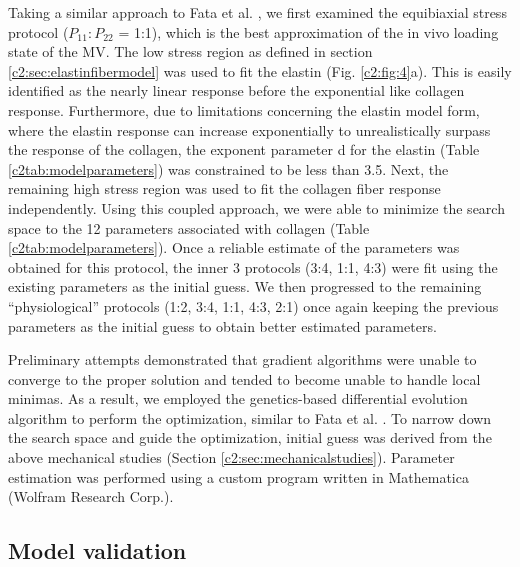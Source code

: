     Taking a similar approach to Fata et al. \cite{fata_insights_2014}, we first examined the equibiaxial stress protocol ($P_{11}:P_{22}$ = 1:1), which is the best approximation of the in vivo loading state of the MV. The low stress region as defined in section \ref{c2:sec:elastinfibermodel} was used to fit the elastin (Fig. \ref{c2:fig:4}a). This is easily identified as the nearly linear response before the exponential like collagen response. Furthermore, due to limitations concerning the elastin model form, where the elastin response can increase exponentially to unrealistically surpass the response of the collagen, the exponent parameter d for the elastin (Table \ref{c2tab:modelparameters}) was constrained to be less than 3.5. Next, the remaining high stress region was used to fit the collagen fiber response independently. Using this coupled approach, we were able to minimize the search space to the 12 parameters associated with collagen (Table \ref{c2tab:modelparameters}). Once a reliable estimate of the parameters was obtained for this protocol, the inner 3 protocols (3:4, 1:1, 4:3) were fit using the existing parameters as the initial guess. We then progressed to the remaining “physiological” protocols (1:2, 3:4, 1:1, 4:3, 2:1) once again keeping the previous parameters as the initial guess to obtain better estimated parameters.
    
    
    Preliminary attempts demonstrated that gradient algorithms were unable to converge to the proper solution and tended to become unable to handle local minimas. As a result, we employed the genetics-based differential evolution algorithm to perform the optimization, similar to Fata et al. \cite{fata_insights_2014}. To narrow down the search space and guide the optimization, initial guess was derived from the above mechanical studies (Section \ref{c2:sec:mechanicalstudies}). Parameter estimation was performed using a custom program written in Mathematica (Wolfram Research Corp.).
    




\subsection{Model validation} \label{c2:sec:26}

